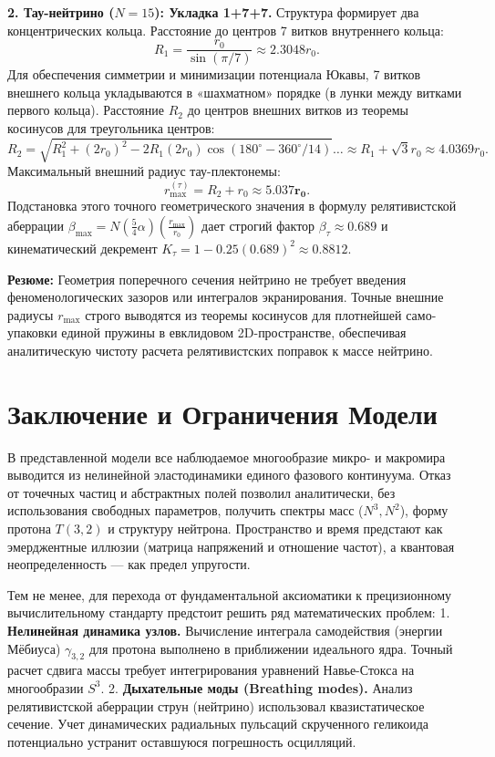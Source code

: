 \documentclass[11pt,a4paper]{article}
\begin{document}
	\textbf{2. Тау-нейтрино ($N=15$): Укладка 1+7+7.}
	Структура формирует два концентрических кольца. Расстояние до центров 7 витков внутреннего кольца:
	\begin{equation}
		R_1 = \frac{r_0}{\sin(\pi/7)} \approx 2.3048 r_0.
	\end{equation}
	Для обеспечения симметрии и минимизации потенциала Юкавы, 7 витков внешнего кольца укладываются в «шахматном» порядке (в лунки между витками первого кольца). Расстояние $R_2$ до центров внешних витков из теоремы косинусов для треугольника центров:
	\begin{equation}
		R_2 = \sqrt{R_1^2 + (2r_0)^2 - 2R_1(2r_0)\cos(180^\circ - 360^\circ/14)} \dots \approx R_1 + \sqrt{3}r_0 \approx 4.0369 r_0.
	\end{equation}
	Максимальный внешний радиус тау-плектонемы:
	\begin{equation}
		r_{\text{max}}^{(\tau)} = R_2 + r_0 \approx \mathbf{5.037 r_0}.
	\end{equation}
	Подстановка этого точного геометрического значения в формулу релятивистской аберрации $\beta_{\text{max}} = N (\frac{5}{4}\alpha) (\frac{r_{\text{max}}}{r_0})$ дает строгий фактор $\beta_\tau \approx 0.689$ и кинематический декремент $K_\tau = 1 - 0.25(0.689)^2 \approx \mathbf{0.8812}$.
	
	\textbf{Резюме:} Геометрия поперечного сечения нейтрино не требует введения феноменологических зазоров или интегралов экранирования. Точные внешние радиусы $r_{\text{max}}$ строго выводятся из теоремы косинусов для плотнейшей само-упаковки единой пружины в евклидовом 2D-пространстве, обеспечивая аналитическую чистоту расчета релятивистских поправок к массе нейтрино.
	
	\section*{Заключение и Ограничения Модели}
	
	В представленной модели все наблюдаемое многообразие микро- и макромира выводится из нелинейной эластодинамики единого фазового континуума. Отказ от точечных частиц и абстрактных полей позволил аналитически, без использования свободных параметров, получить спектры масс ($N^3, N^2$), форму протона $T(3,2)$ и структуру нейтрона. Пространство и время предстают как эмерджентные иллюзии (матрица напряжений и отношение частот), а квантовая неопределенность — как предел упругости.
	
	Тем не менее, для перехода от фундаментальной аксиоматики к прецизионному вычислительному стандарту предстоит решить ряд математических проблем:
	1. \textbf{Нелинейная динамика узлов.} Вычисление интеграла самодействия (энергии Мёбиуса) $\gamma_{3,2}$ для протона выполнено в приближении идеального ядра. Точный расчет сдвига массы требует интегрирования уравнений Навье-Стокса на многообразии $S^3$.
	2. \textbf{Дыхательные моды (Breathing modes).} Анализ релятивистской аберрации струн (нейтрино) использовал квазистатическое сечение. Учет динамических радиальных пульсаций скрученного геликоида потенциально устранит оставшуюся погрешность осцилляций.
	
\end{document}
